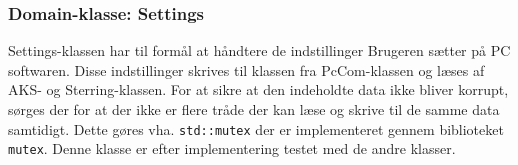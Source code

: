 \subsubsection{Domain-klasse: Settings} \label{sec:settings}
Settings-klassen har til formål at håndtere de indstillinger Brugeren sætter på PC softwaren. 
Disse indstillinger skrives til klassen fra PcCom-klassen og læses af AKS- og Sterring-klassen. 
For at sikre at den indeholdte data ikke bliver korrupt, sørges der for at der ikke er flere tråde der kan læse og skrive til de samme data samtidigt. 
Dette gøres vha. \texttt{std::mutex} der er implementeret gennem biblioteket \texttt{mutex}. 
Denne klasse er efter implementering testet med de andre klasser.